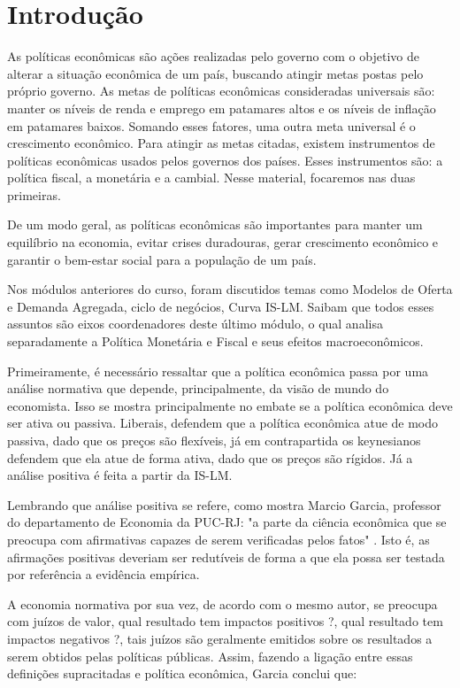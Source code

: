 \section*{Introdução}
As políticas econômicas são ações realizadas pelo governo com o objetivo de alterar a situação econômica de um país, buscando atingir metas postas pelo próprio governo.  As metas de políticas econômicas consideradas universais são: manter os níveis de renda e emprego em patamares altos e os níveis de inflação em patamares baixos. Somando esses fatores, uma outra meta universal é o crescimento econômico.
Para atingir as metas citadas, existem instrumentos de políticas econômicas usados pelos governos dos países. Esses instrumentos são: a política fiscal, a monetária e a cambial. Nesse material, focaremos nas duas primeiras. 

De um modo geral, as políticas econômicas são importantes para manter um equilíbrio na economia, evitar crises duradouras, gerar crescimento econômico e garantir o bem-estar social para a população de um país. 

Nos módulos anteriores do curso, foram discutidos temas como Modelos de Oferta e Demanda Agregada, ciclo de negócios, Curva IS-LM. Saibam que todos esses assuntos são eixos coordenadores deste último módulo, o qual analisa separadamente a Política Monetária e Fiscal e seus efeitos macroeconômicos. 

Primeiramente, é necessário ressaltar que a política econômica passa por uma análise normativa que depende, principalmente, da visão de mundo do economista. Isso se mostra principalmente no embate se a política econômica deve ser ativa ou passiva. Liberais, defendem que a política econômica atue de modo passiva, dado que os preços são flexíveis, já em contrapartida os keynesianos defendem que ela atue de forma ativa, dado que os preços são rígidos. Já a análise positiva é feita a partir da IS-LM. 

Lembrando que análise positiva se refere, como mostra Marcio Garcia, professor do departamento de Economia da PUC-RJ: "a parte da ciência econômica que se preocupa com afirmativas capazes de serem verificadas pelos fatos" \cite{MarcioGarcia}. Isto é, as afirmações positivas deveriam ser redutíveis de forma a que ela possa ser testada por referência a evidência empírica. 

A economia normativa por sua vez, de acordo com o mesmo autor, se preocupa com juízos de valor, qual resultado tem impactos positivos ?, qual resultado tem impactos negativos ?, tais juízos são geralmente emitidos sobre os resultados a serem obtidos pelas políticas públicas. Assim, fazendo a ligação entre essas definições supracitadas e política econômica, Garcia conclui que:

